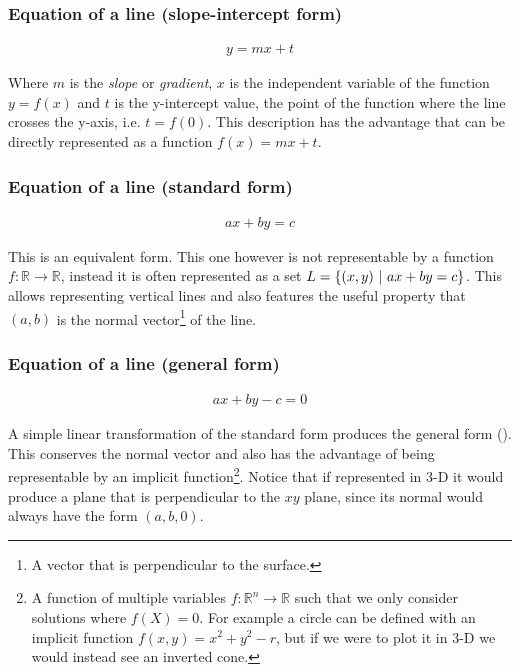 \subsubsection*{Equation of a line (slope-intercept form)}
\begin{align}
    y = mx + t
\end{align}

Where $m$ is the \emph{slope} or \emph{gradient}, $x$ is the independent variable of the function $y = f(x)$ and $t$ is the y-intercept value, the point of the function where the line crosses the y-axis, i.e. $t = f(0)$. This description has the advantage that can be directly represented as a function $f(x) = mx + t$.

\subsubsection*{Equation of a line (standard form)}
\begin{align}
    ax + by = c
\end{align}

This is an equivalent form. This one however is not representable by a function $f: \mathbb{R} \rightarrow \mathbb{R}$, instead it is often represented as a set $L = \{(x, y) \ |\  ax + by = c\}$. This allows representing vertical lines and also features the useful property that $(a, b)$ is the normal vector\footnote{A vector that is perpendicular to the surface.} of the line.

\subsubsection*{Equation of a line (general form)}
\begin{align}
    ax + by - c = 0
\end{align}

A simple linear transformation of the standard form produces the general form (\cite{noauthor_wikipedia_2021}). This conserves the normal vector and also has the advantage of being representable by an implicit function\footnote{A function of multiple variables $f: \mathbb{R}^n \rightarrow \mathbb{R}$ such that we only consider solutions where $f(X) = 0$. For example a circle can be defined with an implicit function $f(x, y) = x^2 + y^2 - r$, but if we were to plot it in 3-D we would instead see an inverted cone.}. Notice that if represented in 3-D it would produce a plane that is perpendicular to the $xy$ plane, since its normal would always have the form $(a, b, 0)$.

